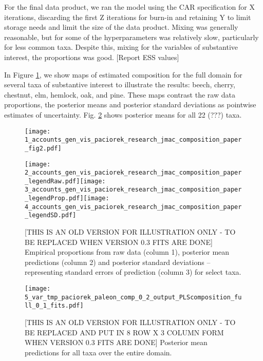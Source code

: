\documentclass[12pt]{article}\usepackage[]{graphicx}\usepackage[]{color}
\begin{document}
For the final data product, we ran the model using the CAR specification
for X iterations, discarding the first Z iterations for burn-in and
retaining Y to limit storage needs and limit the size of the data
product. Mixing was generally reasonable, but for some of the hyperparameters
was relatively slow, particularly for less common taxa. Despite this,
mixing for the variables of substantive interest, the proportions
was good. {[}Report ESS values{]}

In Figure \ref{fig:select_maps}, we show maps of estimated composition
for the full domain for several taxa of substantive interest to illustrate
the results: beech, cherry, chestnut, elm, hemlock, oak, and pine.
These maps contrast the raw data proportions, the posterior means
and posterior standard deviations as pointwise estimates of uncertainty.
Fig. \ref{fig:all_predictions} shows posterior means for all 22 (???)
taxa.

\begin{figure}
\label{fig:select_maps}

\texttt{[image: 1\_accounts\_gen\_vis\_paciorek\_research\_jmac\_composition\_paper\_fig2.pdf]}

\hspace{3mm}\texttt{[image: 2\_accounts\_gen\_vis\_paciorek\_research\_jmac\_composition\_paper\_legendRaw.pdf]}\texttt{[image: 3\_accounts\_gen\_vis\_paciorek\_research\_jmac\_composition\_paper\_legendProp.pdf]}\texttt{[image: 4\_accounts\_gen\_vis\_paciorek\_research\_jmac\_composition\_paper\_legendSD.pdf]}

\caption{{[}THIS IS AN OLD VERSION FOR ILLUSTRATION ONLY - TO BE REPLACED WHEN
VERSION 0.3 FITS ARE DONE{]} Empirical proportions from raw data (column
1), posterior mean predictions (column 2) and posterior standard deviations
-- representing standard errors of prediction (column 3) for select
taxa.}
\end{figure}


\begin{figure}
\label{fig:all_predictions}

\texttt{[image: 5\_var\_tmp\_paciorek\_paleon\_comp\_0\_2\_output\_PLScomposition\_full\_0\_1\_fits.pdf]}

\caption{{[}THIS IS AN OLD VERSION FOR ILLUSTRATION ONLY - TO BE REPLACED AND
PUT IN 8 ROW X 3 COLUMN FORM WHEN VERSION 0.3 FITS ARE DONE{]} Posterior
mean predictions for all taxa over the entire domain.}


\end{figure}
\end{document}
